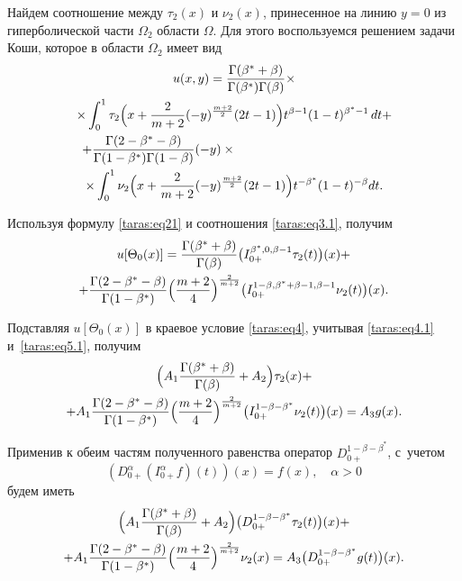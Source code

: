 Найдем соотношение между $\tau_{2}(x)$ и $\nu_{2}(x)$, принесенное на линию $y=0$ из гиперболической части $\Omega_{2}$ области $\Omega$. 
Для этого воспользуемся решением задачи Коши, которое в области $\Omega_{2}$ имеет вид \cite{taras:7}
\begin{multline}
\label{taras:eq21} 
u(x,y) =  \frac{ \Gamma( \beta^{*}+ \beta)}{ \Gamma( \beta^{*}) \Gamma( \beta)}  \times \\
\times 
\int _{0}^{1} \tau_{2} 
\Bigl( x
+ \frac{2}{m+2} (-y)^{ \frac{m+2}{2}} (2t-1) \Bigr) t^{ \beta -1} (1-t)^{ \beta^{*}-1} \, dt + \\
+ \frac{ \Gamma(2- \beta^{*}- \beta)}{ \Gamma(1- \beta^{*}) \Gamma(1- \beta)}  (-y) \times \hspace{4cm}\phantom{1}
\\ 
\times \int_{0}^{1} \nu_{2} \Bigl( x
+ \frac{2}{m+2} (-y)^{ \frac{m+2}{2}} (2t-1) \Bigr) t^{- \beta^{*}} (1-t)^{- \beta}  dt.
\end{multline}

Используя формулу \eqref{taras:eq21} и соотношения \eqref{taras:eq3.1}, получим
\begin{multline}
u[ \Theta_{0}(x)] = \frac{ \Gamma( \beta^{*}+ \beta)}{ \Gamma( \beta)} 
\bigl( I_{0+}^{ \beta^{*}, 0, \beta-1} \tau _{2} (t)\bigr)(x) +
\\
+\frac{ \Gamma(2- \beta^{*}- \beta)}{ \Gamma(1- \beta^{*})} 
\Bigl( \frac{m+2}{4} \Bigr) ^{ \frac{2}{m+2}} 
\bigl(I_{0+}^{1- \beta, \beta^{*}+ \beta -1, \beta-1} \nu_{2}(t) \bigr)(x).
\end{multline}

Подставляя $u[ \Theta_{0}(x)]$ в краевое условие \eqref{taras:eq4}, учитывая \eqref{taras:eq4.1} и~\eqref{taras:eq5.1}, получим
\begin{multline}
\label{taras:eq22} 
\Bigl(  A_{1} \frac{\Gamma( \beta^{*}+ \beta)}{ \Gamma( \beta)} + A_{2} \Bigr) \tau_{2}(x)+ 
\\
+
A_{1} \frac{ \Gamma(2- \beta^{*}- \beta)}{ \Gamma(1- \beta^{*})} \Bigl( \frac{m+2}{4} \Bigr)^{\frac{2}{m+2}} 
\bigl( I_{0+}^{1- \beta-\beta^{*}} \nu_{2} (t)\bigr)  (x)=A_{3} g(x).
\end{multline}

Применив к обеим частям полученного равенства оператор $D_{0+}^{ 1- \beta-\beta^{*}}$, с~учетом
\[
\left( D_{0+}^{\alpha} (I_{0+}^{\alpha} f)(t) \right)(x)= f(x), \quad \alpha>0
\]
будем иметь
\begin{multline}
\Bigl(  A_{1} \frac{\Gamma( \beta^{*}+ \beta)}{ \Gamma( \beta)} + A_{2} \Bigr) 
\bigl( D_{0+}^{ 1- \beta-\beta^{*}} \tau_{2}(t) \bigr)(x)+
\\
+ A_{1} \frac{ \Gamma(2- \beta^{*}- \beta)}{ \Gamma(1- \beta^{*})} 
\Bigl( \frac{m+2}{4} \Bigr)^{\frac{2}{m+2}}  \nu_{2}  (x)=A_{3} \bigl( D_{0+}^{ 1- \beta-\beta^{*}} g(t) \bigr)(x).
\end{multline}

